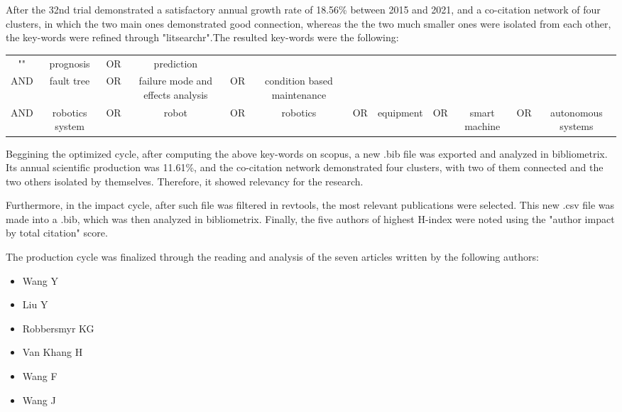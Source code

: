  After the 32nd trial demonstrated a satisfactory annual growth rate of 18.56\% between 2015 and 2021, and a co-citation network of four clusters, in which the two main ones demonstrated good connection, whereas the the two much smaller ones were isolated from each other, the key-words were refined through "litsearchr".The resulted key-words were the following:

 \begin{center}
    \begin{tabular}{ c c c c c c c c c c c c }
        "" & prognosis & OR & prediction \\
        AND & fault tree & OR & failure mode and effects analysis & OR & condition based maintenance \\
        AND & robotics system & OR & robot & OR & robotics & OR &equipment & OR & smart machine & OR & autonomous systems
    \end{tabular}
\end{center}

Beggining the optimized cycle, after computing the above key-words on scopus, a new .bib file was exported and analyzed in bibliometrix. Its annual scientific production was 11.61\%, and the co-citation network demonstrated four clusters, with two of them connected and the two others isolated by themselves. Therefore, it showed relevancy for the research.

Furthermore, in the impact cycle, after such file was filtered in revtools, the most relevant publications were selected. This new .csv file was made into a .bib, which was then analyzed in bibliometrix. Finally, the five authors of highest H-index were noted using the "author impact by total citation" score. 

The production cycle was finalized through the reading and analysis of the seven articles written by the following authors:
\begin{itemize}
    \item Wang Y \cite{wang2018}
    \item Liu Y \cite{liu2021}
    \item Robbersmyr KG \cite{duo2018} \cite{senanayaka2018robust}
    \item Van Khang H \cite{duo2018} \cite{kudelina2021methods}
    \item Wang F \cite{YANG201927}
    \item Wang J \cite{wangj2020}
\end{itemize}

